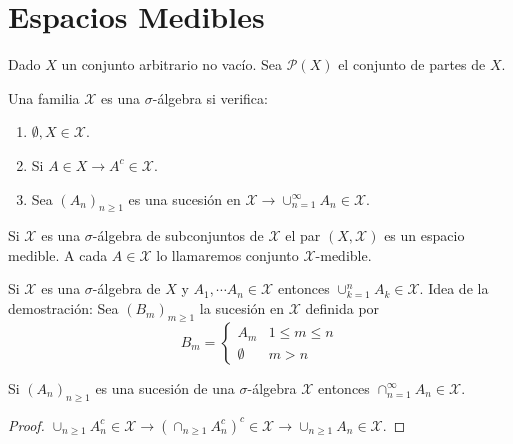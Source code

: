 \section{Espacios Medibles}

Dado $X$ un conjunto arbitrario no vacío. Sea $\mathcal{P}(X)$ el conjunto de partes de $X$.

\begin{definition}
    Una familia $\mathcal{X}$ es una $\sigma$-álgebra si verifica:
    \begin{enumerate}
        \item $\emptyset, X \in \mathcal{X}$.
        \item Si $A \in X \to A^c \in \mathcal{X}$.
        \item Sea $(A_n)_{n \geq 1}$ es una sucesión en $\mathcal{X} \to \cup_{n=1}^{\infty} A_n \in \mathcal{X}$.
    \end{enumerate}
\end{definition}

Si $\mathcal{X}$ es una $\sigma$-álgebra de subconjuntos de $\mathcal{X}$ el par $(X, \mathcal{X})$ es un espacio medible. A cada $A \in \mathcal{X}$
lo llamaremos conjunto $\mathcal{X}$-medible.

\begin{note}
    Si $\mathcal{X}$ es una $\sigma$-álgebra de $X$ y $A_1, \cdots A_n \in \mathcal{X}$ entonces $\cup_{k=1}^{n} A_k \in \mathcal{X}$.
    Idea de la demostración: Sea $(B_m)_{m \geq 1}$ la sucesión en $\mathcal{X}$ definida por \begin{equation}
        B_m = \begin{cases}
            A_m       & 1 \leq m \leq n \\
            \emptyset & m > n
        \end{cases}
    \end{equation}
\end{note}

\begin{note}
    Si $(A_n)_{n \geq 1}$ es una sucesión de una $\sigma$-álgebra $\mathcal{X}$ entonces $\cap_{n=1}^{\infty} A_n \in \mathcal{X}$.
    \begin{proof}
        $\cup_{n \geq 1} A_n^c \in \mathcal{X} \to (\cap_{n \geq 1} A_n^c)^c \in \mathcal{X} \to \cup_{n \geq 1} A_n \in \mathcal{X}$.
    \end{proof}
\end{note}

